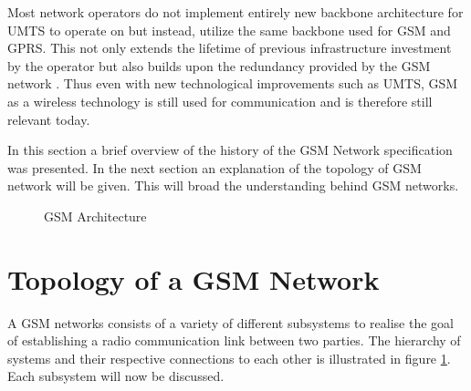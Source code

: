 Most network operators do not implement entirely new backbone architecture for UMTS\label{UMTSGSMBackbone} to operate on but instead, utilize the same backbone used for GSM and GPRS. This not only extends the lifetime of previous infrastructure investment by the operator but also builds upon the redundancy provided by the GSM network \cite{GSMArchitectureProtocolsServices}. Thus even with new technological improvements such as UMTS, GSM as a wireless technology is still used for communication and is therefore still relevant today.

In this section a brief overview of the history of the GSM Network specification was presented. In the next section an explanation of the topology of GSM network will be given. This will broad the understanding behind GSM networks.

\begin{figure}[hptb]
	\begin{centering}
		
		\caption{GSM Architecture}
		\label{fig:GSMArchitecture}
	\end{centering}
\end{figure}

\section{Topology of a GSM Network}
\label{sec:GSMArch}
A GSM networks consists of a variety of different subsystems to realise the goal of establishing a radio communication link between two parties. The hierarchy of systems and their respective connections to each other is illustrated in figure \ref{fig:GSMArchitecture}. Each subsystem will now be discussed.

